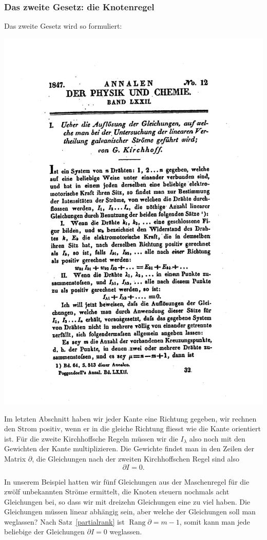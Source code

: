\subsubsection{Das zweite Gesetz: die Knotenregel}
Das zweite Gesetz wird so formuliert:
\bigskip
\begin{center}
\includegraphics[width=0.7\hsize]{graphics/kh2}
\end{center}
\bigskip
Im letzten Abschnitt haben wir jeder Kante eine Richtung gegeben,
wir rechnen den Strom positiv, wenn er in die gleiche Richtung fliesst
wie die Kante orientiert ist. Für die zweite Kirchhoffsche Regeln
müssen wir die $I_\lambda$ also noch mit den Gewichten der Kante
multiplizieren. Die Gewichte findet man in den Zeilen der Matrix
$\partial$, die Gleichungen nach der zweiten Kirchhoffschen
Regel sind also
\[
\partial I=0.
\]

In unserem Beispiel hatten wir fünf Gleichungen aus der Maschenregel
für die zwölf unbekannten Ströme ermittelt, die Knoten steuern
nochmals acht Gleichungen bei, so dass wir mit dreizehn Gleichungen
eine zu viel haben. Die Gleichungen müssen linear abhängig sein,
aber welche der Gleichungen soll man weglassen?
Nach Satz~\ref{partialrank} ist $\operatorname{Rang}\partial=m-1$,
somit kann man jede beliebige der Gleichungen $\partial I=0$ weglassen.

